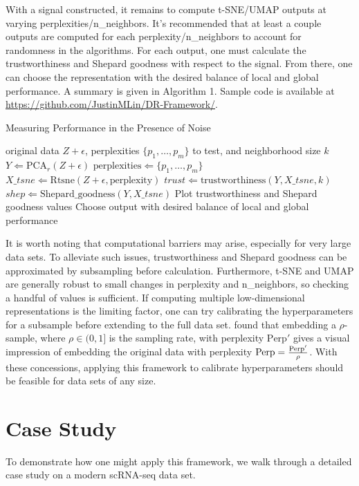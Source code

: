 \documentclass{article}
\begin{document}
With a signal constructed, it remains to compute t-SNE/UMAP outputs at varying perplexities/n\_neighbors. It's recommended that at least a couple outputs are computed for each perplexity/n\_neighbors to account for randomness in the algorithms. For each output, one must calculate the trustworthiness and Shepard goodness with respect to the signal. From there, one can choose the representation with the desired balance of local and global performance. A summary is given in Algorithm 1. Sample code is available at \url{https://github.com/JustinMLin/DR-Framework/}.

\begin{algorithm}[H]
\caption{Measuring Performance in the Presence of Noise}\label{algo1}
\begin{algorithmic}[1]
\Require original data $Z + \epsilon$, perplexities $\{p_1, \hdots, p_m\}$ to test, and neighborhood size $k$
\State $Y \Leftarrow \textrm{PCA}_r(Z + \epsilon)$
\State $\textrm{perplexities} \Leftarrow \{p_1, \hdots, p_m\}$
	\Loop
		\State $X\_tsne \Leftarrow \textrm{Rtsne}(Z + \epsilon, \textrm{perplexity})$
		\State $trust \Leftarrow \textrm{trustworthiness}(Y, X\_tsne, k)$
		\State $shep \Leftarrow \textrm{Shepard\_goodness}(Y, X\_tsne)$
	\EndLoop
\EndFor
\State Plot trustworthiness and Shepard goodness values
\State Choose output with desired balance of local and global performance
\end{algorithmic}
\end{algorithm}

It is worth noting that computational barriers may arise, especially for very large data sets. To alleviate such issues, trustworthiness and Shepard goodness can be approximated by subsampling before calculation. Furthermore, t-SNE and UMAP are generally robust to small changes in perplexity and n\_neighbors, so checking a handful of values is sufficient. If computing multiple low-dimensional representations is the limiting factor, one can try calibrating the hyperparameters for a subsample before extending to the full data set. \cite{subsample t-SNE} found that embedding a $\rho$-sample, where $\rho \in (0,1]$ is the sampling rate, with perplexity $\textrm{Perp}'$ gives a visual impression of embedding the original data with perplexity $\textrm{\textrm{Perp}} = \frac{\textrm{Perp}'}{\rho}$. With these concessions, applying this framework to calibrate hyperparameters should be feasible for data sets of any size.

\section{Case Study}
To demonstrate how one might apply this framework, we walk through a detailed case study on a modern scRNA-seq data set.
\end{document}
